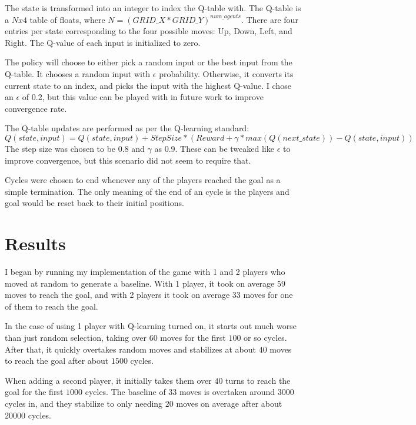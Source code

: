\documentclass[sigconf]{aamas}
\begin{document}
The state is transformed into an integer to index the Q-table with. The 
Q-table is a $Nx4$ table of floats, where $N=(GRID\_X * GRID\_Y)^
{num\_agents}$. There are four entries per state corresponding to the 
four possible moves: Up, Down, Left, and Right. The Q-value of each input 
is initialized to zero. 

The policy will choose to either pick a random input or the best input 
from the Q-table. It chooses a random input with $\epsilon$ probability.
Otherwise, it converts its current state to an index, and picks the input 
with the highest Q-value. I chose an $\epsilon$ of 0.2, but this value can be 
played with in future work to improve convergence rate.

The Q-table updates are performed as per the Q-learning standard: 
$Q(state, input) = Q(state, input) + StepSize * (Reward + \gamma*max(Q(next\_state)) - Q(state, input))$
The step size was chosen to be 0.8 and $\gamma$ as 0.9. These can be tweaked 
like $\epsilon$ to improve convergence, but this scenario did not seem to 
require that.

Cycles were chosen to end whenever any of the players reached the goal as 
a simple termination. The only meaning of the end of an cycle is the players 
and goal would be reset back to their initial positions.


\section{Results}

I began by running my implementation of the game with 1 and 2 players who
moved at random to generate a baseline. With 1 player, it took on average 
$59$ moves to reach the goal, and with 2 players it took on average $33$ 
moves for one of them to reach the goal.

In the case of using 1 player with Q-learning turned on, it starts out 
much worse than just random selection, taking over 60 moves for the first 
$100$ or so cycles. After that, it quickly overtakes random moves and 
stabilizes at about $40$ moves to reach the goal after about $1500$ cycles.

When adding a second player, it initially takes them over $40$ turns to 
reach the goal for the first $1000$ cycles. The baseline of $33$ moves is
overtaken around $3000$ cycles in, and they stabilize to only needing $20$
moves on average after about $20000$ cycles.
\end{document}
